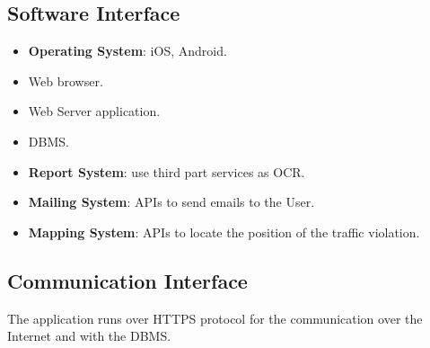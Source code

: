 \documentclass{report}
\begin{document}
\subsection{Software Interface}
\begin{itemize}
\item \textbf{Operating System}: iOS, Android.
\item Web browser.
\item Web Server application.
\item DBMS.
\item \textbf{Report System}: use third part services as OCR.
\item \textbf{Mailing System}: APIs to send emails to the User.
\item \textbf{Mapping System}: APIs to locate the position of the traffic violation.
\end{itemize}
\subsection{Communication Interface}
The application runs over HTTPS protocol for the communication over the Internet and with the DBMS.
\end{document}
